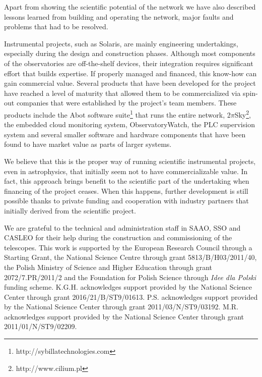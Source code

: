 Apart from showing the scientific potential of the network we have also described lessons learned from building and operating the network, major faults and problems that had to be resolved. 

Instrumental projects, such as Solaris, are mainly engineering undertakings, especially during the design and construction phases. Although most components of the observatories are off-the-shelf devices, their integration requires significant effort that builds expertise. If properly managed and financed, this know-how can gain commercial value. Several products that have been developed for the project have reached a level of maturity that allowed them to be commercialized via spin-out companies that were established by the project's team members. These products include the Abot software suite\footnote{http://sybillatechnologies.com} that runs the entire network, 2$\pi$Sky\footnote{http://www.cilium.pl}, the embedded cloud monitoring system, ObservatoryWatch, the PLC supervision system and several smaller software and hardware components that have been found to have market value as parts of larger systems. 

We believe that this is the proper way of running scientific instrumental projects, even in astrophysics, that initially seem not to have commercializable value. In fact, this approach brings benefit to the scientific part of the undertaking when financing of the project ceases. When this happens, further development is still possible thanks to private funding and cooperation with industry partners that initially derived from the scientific project. 

\acknowledgments

We are grateful to the technical and administration staff in SAAO, SSO and CASLEO for their help during the construction and commissioning of the telescopes.
This work is supported by the European Research Council through a Starting Grant, the National Science Centre through grant 5813/B/H03/2011/40, the Polish Ministry of Science and Higher Education through grant 2072/7.PR/2011/2 and the Foundation for Polish Science through \textit{Idee dla Polski} funding scheme. K.G.H. acknowledges support provided by the National Science Center through grant 2016/21/B/ST9/01613. P.S. acknowledges support provided by the National Science Center through grant 2011/03/N/ST9/03192. M.R. acknowledges support provided by the National Science Center through grant 2011/01/N/ST9/02209.

